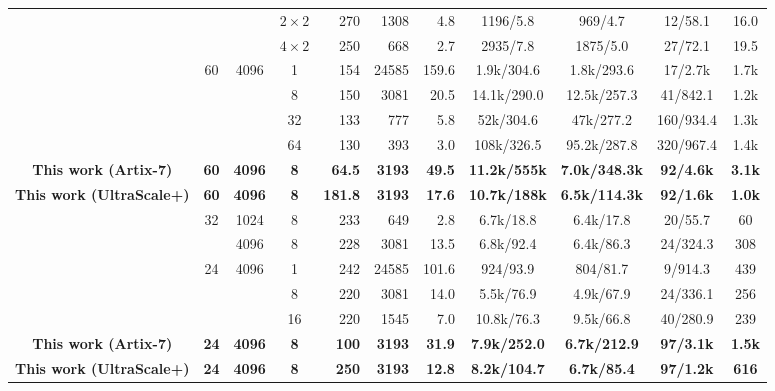 \documentclass[a4paper, 12pt, titlepage]{article}
\begin{document}
\begin{table}[H]
{\begin{tabular}{|c|c|c|c|r|r|r|c|c|c|c|}
\cline{4-11}
& & & \(2{\times}2\) & 270 & 1308 & 4.8 & 1196/5.8 & 969/4.7 & 12/58.1 & 16.0 \\
\cline{4-11}
& & & \(4{\times}2\) & 250 & 668 & 2.7 & 2935/7.8 & 1875/5.0 & 27/72.1 & 19.5 \\
\hline
\multirow{4}{*}{\cite{area-efficient}} & \multirow{4}{*}{60} & \multirow{4}{*}{4096} & 1 & 154 & 24585 & 159.6 & 1.9k/304.6 & 1.8k/293.6 & 17/2.7k & 1.7k \\
\cline{4-11}
& & & 8 & 150 & 3081 & 20.5 & 14.1k/290.0 & 12.5k/257.3 & 41/842.1 & 1.2k \\
\cline{4-11}
& & & 32 & 133 & 777 & 5.8 & 52k/304.6 & 47k/277.2 & 160/934.4 & 1.3k \\
\cline{4-11}
& & & 64 & 130 & 393 & 3.0 & 108k/326.5 & 95.2k/287.8 & 320/967.4 & 1.4k \\
\hline
\textbf{This work (Artix-7)} & \textbf{60} & \textbf{4096} & \textbf{8} & \textbf{64.5} & \textbf{3193} & \textbf{49.5} & \textbf{11.2k/555k} & \textbf{7.0k/348.3k} & \textbf{92/4.6k} & \textbf{3.1k} \\
\hline
\textbf{This work (UltraScale+)} & \textbf{60} & \textbf{4096} & \textbf{8} & \textbf{181.8} & \textbf{3193} & \textbf{17.6} & \textbf{10.7k/188k} & \textbf{6.5k/114.3k} & \textbf{92/1.6k} & \textbf{1.0k} \\
\hline
\multirow{2}{*}{\cite{area-efficient}} & \multirow{2}{*}{32} & 1024 & 8 & 233 & 649 & 2.8 & 6.7k/18.8 & 6.4k/17.8 & 20/55.7 & 60 \\
\cline{3-11}
& & 4096 & 8 & 228 & 3081 & 13.5 & 6.8k/92.4 & 6.4k/86.3 & 24/324.3 & 308 \\
\hline
\multirow{3}{*}{\cite{area-efficient}} & \multirow{3}{*}{24} & \multirow{3}{*}{4096} & 1 & 242 & 24585 & 101.6 & 924/93.9 & 804/81.7 & 9/914.3 & 439 \\
\cline{4-11}
& & & 8 & 220 & 3081 & 14.0 & 5.5k/76.9 & 4.9k/67.9 & 24/336.1 & 256 \\
\cline{4-11}
& & & 16 & 220 & 1545 & 7.0 & 10.8k/76.3 & 9.5k/66.8 & 40/280.9 & 239 \\
\hline
\textbf{This work (Artix-7)} & \textbf{24} & \textbf{4096} & \textbf{8} & \textbf{100} & \textbf{3193} & \textbf{31.9} & \textbf{7.9k/252.0} & \textbf{6.7k/212.9} & \textbf{97/3.1k} & \textbf{1.5k} \\
\hline
\textbf{This work (UltraScale+)} & \textbf{24} & \textbf{4096} & \textbf{8} & \textbf{250} & \textbf{3193} & \textbf{12.8} & \textbf{8.2k/104.7} & \textbf{6.7k/85.4} & \textbf{97/1.2k} & \textbf{616} \\

\end{tabular}}
\end{table}
\end{document}
